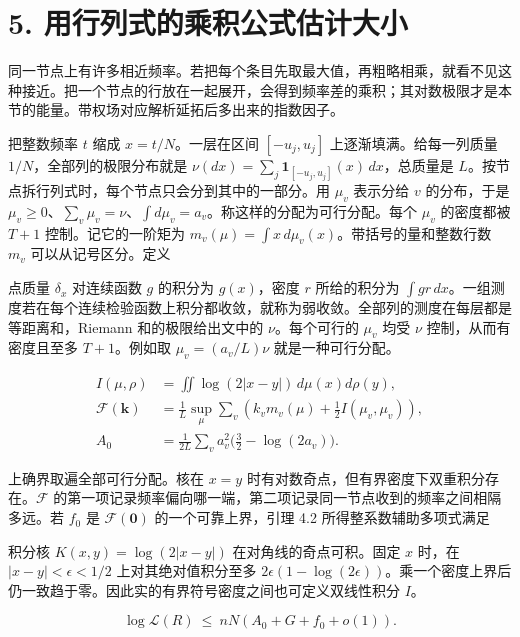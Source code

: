 \documentclass[11pt,a4paper]{article}
\begin{document}
\section{5. 用行列式的乘积公式估计大小}\label{ux7528ux884cux5217ux5f0fux7684ux4e58ux79efux516cux5f0fux4f30ux8ba1ux5927ux5c0f}

同一节点上有许多相近频率。若把每个条目先取最大值，再粗略相乘，就看不见这种接近。把一个节点的行放在一起展开，会得到频率差的乘积；其对数极限才是本节的能量。带权场对应解析延拓后多出来的指数因子。

把整数频率 \(t\) 缩成 \(x=t/N\)。一层在区间 \([-u_j,u_j]\) 上逐渐填满。给每一列质量 \(1/N\)，全部列的极限分布就是 \(\nu(dx)=\sum_j\mathbf1_{[-u_j,u_j]}(x)\,dx\)，总质量是 \(L\)。按节点拆行列式时，每个节点只会分到其中的一部分。用 \(\mu_v\) 表示分给 \(v\) 的分布，于是 \(\mu_v\ge0\)、\(\sum_v\mu_v=\nu\)、\(\int d\mu_v=a_v\)。称这样的分配为可行分配。每个 \(\mu_v\) 的密度都被 \(T+1\) 控制。记它的一阶矩为 \(m_v(\mu)=\int x\,d\mu_v(x)\)。带括号的量和整数行数 \(m_v\) 可以从记号区分。定义

点质量 \(\delta_x\) 对连续函数 \(g\) 的积分为 \(g(x)\)，密度 \(r\) 所给的积分为 \(\int gr\,dx\)。一组测度若在每个连续检验函数上积分都收敛，就称为弱收敛。全部列的测度在每层都是等距离和，Riemann 和的极限给出文中的 \(\nu\)。每个可行的 \(\mu_v\) 均受 \(\nu\) 控制，从而有密度且至多 \(T+1\)。例如取 \(\mu_v=(a_v/L)\nu\) 就是一种可行分配。

\[
 \begin{aligned}
 I(\mu,\rho)&=\iint\log(2|x-y|)\,d\mu(x)d\rho(y),\\
 \mathcal F(\mathbf k)&=\frac1L\sup_\mu\sum_v
       \left(k_v m_v(\mu)+\tfrac12 I(\mu_v,\mu_v)\right),\\
 A_0&=\frac1{2L}\sum_v a_v^2\big(\tfrac32-\log(2a_v)\big).
 \end{aligned}                                                            \tag{12}\label{eq:12}
\]

上确界取遍全部可行分配。核在 \(x=y\) 时有对数奇点，但有界密度下双重积分存在。\(\mathcal F\) 的第一项记录频率偏向哪一端，第二项记录同一节点收到的频率之间相隔多远。若 \(f_0\) 是 \(\mathcal F(\mathbf0)\) 的一个可靠上界，引理 4.2 所得整系数辅助多项式满足

积分核 \(K(x,y)=\log(2|x-y|)\) 在对角线的奇点可积。固定 \(x\) 时，在 \(|x-y|<\epsilon<1/2\) 上对其绝对值积分至多 \(2\epsilon(1-\log(2\epsilon))\)。乘一个密度上界后仍一致趋于零。因此实的有界符号密度之间也可定义双线性积分 \(I\)。

\[
 \log\mathcal L(R)\ \le\ nN(A_0+G+f_0+o(1)).                              \tag{13}\label{eq:13}
\]
\end{document}
